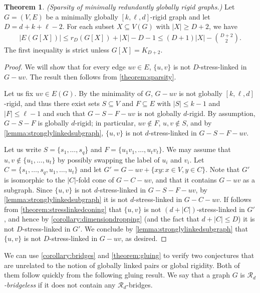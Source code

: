 \documentclass[11pt,a4paper,dvipsnames]{scrartcl}
\theoremstyle{definition}
\newtheorem{theorem}{Theorem}[section]
\newcommand{\strongly}[1]{${#1}$-stress-linked}
\newcommand{\bigdim}{D}
\begin{document}
\begin{theorem} \emph{(Sparsity of minimally redundantly globally rigid graphs.)} \newline
    Let $G = (V,E)$ be a minimally globally $[k,\ell,d]$-rigid graph and let $\bigdim = d+k+\ell- 2$. For each subset $X \subseteq V(G)$ with $|X| \geq \bigdim + 2$, we have
    \begin{align*}
        |E(G[X])| \leq r_{\bigdim}(G[X]) + |X| - \bigdim - 1 \leq (\bigdim + 1)|X| - \binom{\bigdim+2}{2}.
    \end{align*}
    The first inequality is strict unless $G[X] = K_{\bigdim+2}$.
\end{theorem}
\begin{proof}
    We will show that for every edge $uv \in E$, $\{u,v\}$ is not \strongly{\bigdim} in $G-uv$. The result then follows from \cref{theorem:sparsity}.

    Let us fix $uv \in E(G)$. By the minimality of $G$, $G-uv$ is not globally $[k,\ell,d]$-rigid, and thus there exist sets $S \subseteq V$ and $F \subseteq E$ with $|S| \leq k-1$ and $|F| \leq \ell-1$ and such that $G-S-F-uv$ is not globally $d$-rigid. By assumption, $G-S-F$ is globally $d$-rigid; in particular, $uv \notin F$, $u,v \notin S$, and by \cref{lemma:stronglylinkedsubgraph}, $\{u,v\}$ is not \strongly{d} in $G-S-F-uv$.

    Let us write $S = \{s_1,\ldots,s_q$\} and $F = \{u_1v_1,\ldots,u_tv_t\}$. We may assume that $u,v \notin \{u_1,\ldots,u_t\}$ by possibly swapping the label of $u_i$ and $v_i$. Let $C = \{s_1,\ldots,s_q,u_1,\ldots,u_t\}$ and let $G' = G - uv + \{xy: x \in V, y \in C\}$. Note that $G'$ is isomorphic to the $|C|$-fold cone of $G-C-uv$, and that it contains $G-uv$ as a subgraph. Since $\{u,v\}$ is not \strongly{d} in $G-S-F-uv$, by \cref{lemma:stronglylinkedsubgraph} it is not \strongly{d} in $G-C-uv$. If follows from \cref{theorem:stresslinkedconing} that $\{u,v\}$ is not \strongly{(d+|C|)} in $G'$, and hence by \cref{corollary:dimensiondropping} (and the fact that $d+|C| \leq \bigdim$) it is not \strongly{\bigdim} in $G'$. We conclude by \cref{lemma:stronglylinkedsubgraph} that $\{u,v\}$ is not \strongly{\bigdim} in $G-uv$, as desired.
\end{proof}

We can use
\cref{corollary:bridges} and \cref{theorem:gluing} to verify two conjectures that are unrelated to the notion of globally linked pairs or global rigidity. Both of them follow quickly from the following gluing result. We say that a graph $G$ is \emph{$\mathcal{R}_d$-bridgeless} if it does not contain any $\mathcal{R}_d$-bridges.
\end{document}
